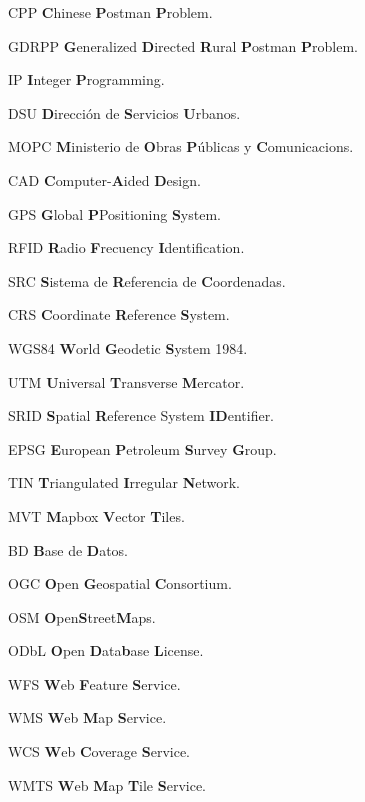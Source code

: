 \begin{abbreviations}
    \item[CPP] \textbf{C}hinese \textbf{P}ostman \textbf{P}roblem.
    \item[GDRPP] \textbf{G}eneralized \textbf{D}irected \textbf{R}ural \textbf{P}ostman \textbf{P}roblem.
    \item[IP] \textbf{I}nteger \textbf{P}rogramming.
    \item[DSU] \textbf{D}irección de \textbf{S}ervicios \textbf{U}rbanos.
    \item[MOPC] \textbf{M}inisterio de \textbf{O}bras \textbf{P}úblicas y \textbf{C}omunicacions.
    \item[CAD] \textbf{C}omputer-\textbf{A}ided \textbf{D}esign.
    \item[GPS] \textbf{G}lobal \textbf{P}Positioning \textbf{S}ystem.
    \item[RFID] \textbf{R}adio \textbf{F}recuency \textbf{I}dentification.
    \item[SRC] \textbf{S}istema de \textbf{R}eferencia de \textbf{C}oordenadas.
    \item[CRS] \textbf{C}oordinate \textbf{R}eference \textbf{S}ystem.
    \item[WGS84] \textbf{W}orld \textbf{G}eodetic \textbf{S}ystem 1984.
    \item[UTM] \textbf{U}niversal \textbf{T}ransverse \textbf{M}ercator.
    \item[SRID] \textbf{S}patial \textbf{R}eference System \textbf{ID}entifier.
    \item[EPSG] \textbf{E}uropean \textbf{P}etroleum \textbf{S}urvey \textbf{G}roup.
    \item[TIN] \textbf{T}riangulated \textbf{I}rregular \textbf{N}etwork.
    \item[MVT] \textbf{M}apbox \textbf{V}ector \textbf{T}iles.
    \item[BD] \textbf{B}ase de \textbf{D}atos.
    \item[OGC] \textbf{O}pen \textbf{G}eospatial \textbf{C}onsortium.
    \item[OSM] \textbf{O}pen\textbf{S}treet\textbf{M}aps.
    \item[ODbL] \textbf{O}pen \textbf{D}ata\textbf{b}ase \textbf{L}icense.
    \item[WFS] \textbf{W}eb \textbf{F}eature \textbf{S}ervice.
    \item[WMS] \textbf{W}eb \textbf{M}ap \textbf{S}ervice.
    \item[WCS] \textbf{W}eb \textbf{C}overage \textbf{S}ervice.
    \item[WMTS] \textbf{W}eb \textbf{M}ap \textbf{T}ile \textbf{S}ervice.
    

\end{abbreviations}
